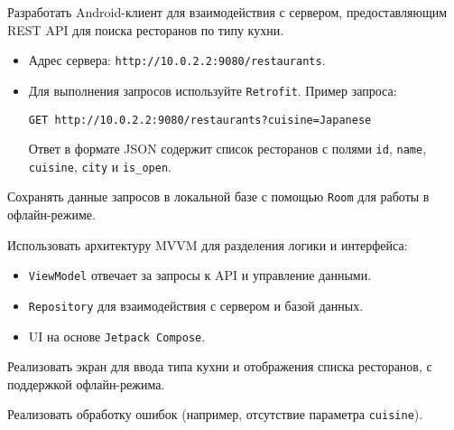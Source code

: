 
Разработать Android-клиент для взаимодействия с сервером, предоставляющим REST API для поиска ресторанов по типу кухни. 

\begin{itemize}
    \item Адрес сервера: \texttt{http://10.0.2.2:9080/restaurants}.
    \item Для выполнения запросов используйте \texttt{Retrofit}. Пример запроса:
\begin{verbatim}
GET http://10.0.2.2:9080/restaurants?cuisine=Japanese
\end{verbatim}
Ответ в формате JSON содержит список ресторанов с полями \texttt{id}, \texttt{name}, \texttt{cuisine}, \texttt{city} и \texttt{is_open}.
\end{itemize}

Сохранять данные запросов в локальной базе с помощью \texttt{Room} для работы в офлайн-режиме.

Использовать архитектуру MVVM для разделения логики и интерфейса:
\begin{itemize}
    \item \texttt{ViewModel} отвечает за запросы к API и управление данными.
    \item \texttt{Repository} для взаимодействия с сервером и базой данных.
    \item UI на основе \texttt{Jetpack Compose}.
\end{itemize}

Реализовать экран для ввода типа кухни и отображения списка ресторанов, с поддержкой офлайн-режима.

Реализовать обработку ошибок (например, отсутствие параметра \texttt{cuisine}).
